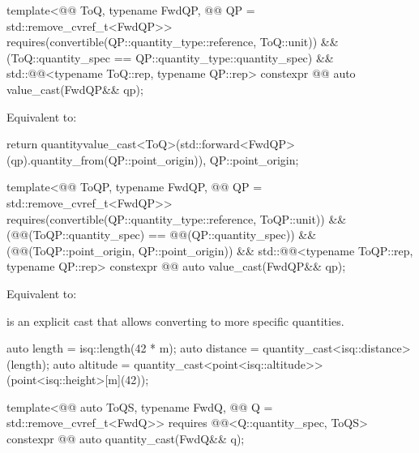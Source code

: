 \begin{itemdecl}
template<@@ ToQ, typename FwdQP, @@ QP = std::remove_cvref_t<FwdQP>>
  requires(convertible(QP::quantity_type::reference, ToQ::unit)) &&
          (ToQ::quantity_spec == QP::quantity_type::quantity_spec) &&
          std::@@<typename ToQ::rep, typename QP::rep>
constexpr @@ auto value_cast(FwdQP&& qp);
\end{itemdecl}

\begin{itemdescr}
\pnum
\effects
Equivalent to:
\begin{codeblock}
return quantity{value_cast<ToQ>(std::forward<FwdQP>(qp).quantity_from(QP::point_origin)),
                QP::point_origin};
\end{codeblock}
\end{itemdescr}

\begin{itemdecl}
template<@@ ToQP, typename FwdQP, @@ QP = std::remove_cvref_t<FwdQP>>
  requires(convertible(QP::quantity_type::reference, ToQP::unit)) &&
          (@@(ToQP::quantity_spec) == @@(QP::quantity_spec)) &&
          (@@(ToQP::point_origin, QP::point_origin)) &&
          std::@@<typename ToQP::rep, typename QP::rep>
constexpr @@ auto value_cast(FwdQP&& qp);
\end{itemdecl}

\begin{itemdescr}
\pnum
\effects
Equivalent to:
\end{itemdescr}

\pnum
{} is an explicit cast that allows converting to more specific quantities.
\begin{example}
\begin{codeblock}
auto length = isq::length(42 * m);
auto distance = quantity_cast<isq::distance>(length);
auto altitude = quantity_cast<point<isq::altitude>>(point<isq::height>[m](42));
\end{codeblock}
\end{example}

\begin{itemdecl}
template<@@ auto ToQS, typename FwdQ, @@ Q = std::remove_cvref_t<FwdQ>>
  requires @@<Q::quantity_spec, ToQS>
constexpr @@ auto quantity_cast(FwdQ&& q);
\end{itemdecl}

